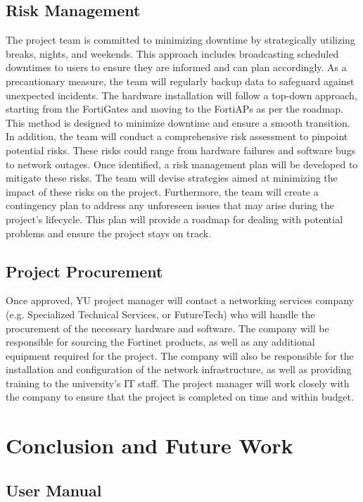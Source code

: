 \documentclass[12pt]{report}
\begin{document}
\section{Risk Management}
The project team is committed to minimizing downtime by strategically utilizing breaks, nights, and weekends. This approach includes broadcasting scheduled downtimes to users to ensure they are informed and can plan accordingly. As a precautionary measure, the team will regularly backup data to safeguard against unexpected incidents. The hardware installation will follow a top-down approach, starting from the FortiGates and moving to the FortiAPs as per the roadmap. This method is designed to minimize downtime and ensure a smooth transition. In addition, the team will conduct a comprehensive risk assessment to pinpoint potential risks. These risks could range from hardware failures and software bugs to network outages. Once identified, a risk management plan will be developed to mitigate these risks. The team will devise strategies aimed at minimizing the impact of these risks on the project. Furthermore, the team will create a contingency plan to address any unforeseen issues that may arise during the project's lifecycle. This plan will provide a roadmap for dealing with potential problems and ensure the project stays on track.
\section{Project Procurement}
Once approved, YU project manager will contact a networking services company (e.g. Specialized Technical Services, or FutureTech) who will handle the procurement of the necessary hardware and software. The company will be responsible for sourcing the Fortinet products, as well as any additional equipment required for the project. The company will also be responsible for the installation and configuration of the network infrastructure, as well as providing training to the university's IT staff. The project manager will work closely with the company to ensure that the project is completed on time and within budget.

\chapter{Conclusion and Future Work}
\newpage



\newpage

\begin{appendices}

\chapter{User Manual}
           
\end{appendices}
\end{document}
